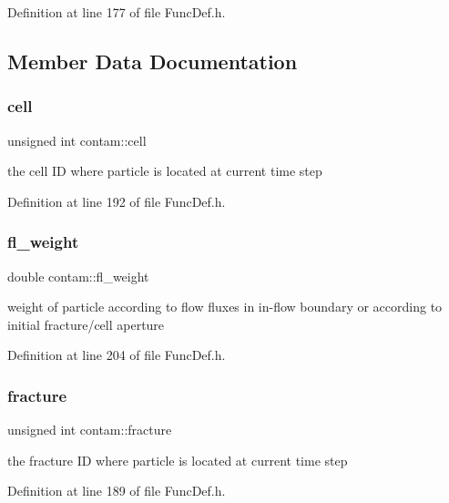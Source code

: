 Definition at line 177 of file Func\+Def.\+h.



\subsection{Member Data Documentation}
\mbox{\label{structcontam_a858c05f3221a70f6e212c1e7e172252c}} 
\subsubsection{\texorpdfstring{cell}{cell}}
{\footnotesize\ttfamily unsigned int contam\+::cell}

the cell ID where particle is located at current time step 

Definition at line 192 of file Func\+Def.\+h.

\mbox{\label{structcontam_ad50f20b01e37af1fedfd7bbe0cd1d7e3}} 
\subsubsection{\texorpdfstring{fl\_weight}{fl\_weight}}
{\footnotesize\ttfamily double contam\+::fl\+\_\+weight}

weight of particle according to flow fluxes in in-\/flow boundary or according to initial fracture/cell aperture 

Definition at line 204 of file Func\+Def.\+h.

\mbox{\label{structcontam_a0b9253ce268d781958145f9d110df2de}} 
\subsubsection{\texorpdfstring{fracture}{fracture}}
{\footnotesize\ttfamily unsigned int contam\+::fracture}

the fracture ID where particle is located at current time step 

Definition at line 189 of file Func\+Def.\+h.

\mbox{\label{structcontam_a1747a7b7a63f22656afa1df6462279e8}} 
